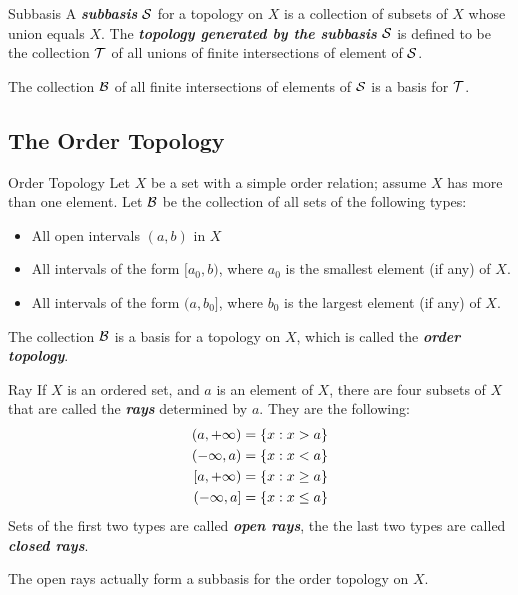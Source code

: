 \documentclass[12pt,a4paper]{article}
\begin{document}
    \begin{defi}{Subbasis}
        A \textbf{\textit{subbasis}} $\S$ for a topology on $X$ is a collection of subsets of $X$ whose union equals $X$. The \textit{\textbf{topology generated by the subbasis}} $\S$ is defined to be the collection $\topo$ of all unions of finite intersections of element of $\S$.
    \end{defi}
    \begin{remark}
        The collection $\B$ of all finite intersections of elements of $\S$ is a basis for $\topo$.
    \end{remark}
    \hfill

    \subsection{The Order Topology}
    \begin{defi}{Order Topology}
        Let $X$ be a set with a simple order relation; assume $X$ has more than one element. Let $\B$ be the collection of all sets of the following types:
        \begin{itemize}
            \item All open intervals $(a,b)$ in $X$
            \item All intervals of the form $[a_0,b)$, where $a_0$ is the smallest element (if any) of $X$.
            \item All intervals of the form $(a,b_0]$, where $b_0$ is the largest element (if any) of $X$.
        \end{itemize}
        The collection $\B$ is a basis for a topology on $X$, which is called the \textit{\textbf{order topology}}.
    \end{defi}
    \hfill

    \begin{defi}{Ray}
        If $X$ is an ordered set, and $a$ is an element of $X$, there are four subsets of $X$ that are called the \textbf{\textit{rays}} determined by $a$. They are the following:
        $$
        \begin{aligned}
            (a,+\infty)&=\set{x:x>a}\\
            (-\infty,a)&=\set{x:x<a}\\
            [a,+\infty)&=\set{x:x\geq a}\\
            (-\infty,a]&=\set{x:x\leq a}
        \end{aligned}
        $$
        Sets of the first two types are called \textit{\textbf{open rays}}, the the last two types are called \textit{\textbf{closed rays}}.
    \end{defi}
    \begin{remark}
        The open rays actually form a subbasis for the order topology on $X$.
    \end{remark}
    \hfill
\end{document}
